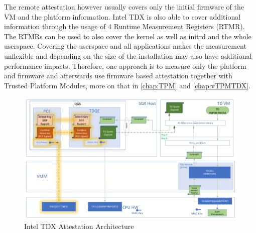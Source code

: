 \documentclass[sigplan,screen,nonacm]{acmart}
\begin{document}
The remote attestation however usually covers only the initial firmware of the VM and the platform information\cite{CA-KVM}.
Intel TDX is also able to cover additional information through the usage of 4 Runtime Measurement Registers (RTMR)\cite{CA-KVM}.
The RTMRs can be used to also cover the kernel as well as initrd and the whole userspace.
Covering the userspace and all applications makes the measurement unflexible and depending on the size of the installation may also have additional performance impacts\cite{CA-KVM}.
Therefore, one approach is to measure only the platform and firmware and afterwards use firmware based attestation together with Trusted Platform Modules, more on that in \cref{chap:TPM} and \cref{chap:vTPMTDX}.

\begin{figure}
  \centering
  \includegraphics[width=\linewidth]{pictures/Enclaves.png}
  \caption{Intel TDX Attestation Architecture \cite{Intel-QVL}}
  \label{fig:tdxattest}
\end{figure}
\end{document}
